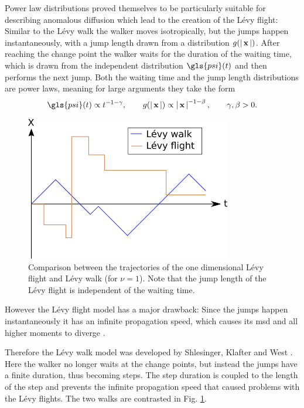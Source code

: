 Power law distributions proved themselves to be particularly suitable for describing anomalous diffusion which lead to the creation of the 
L\'evy flight: Similar to the L\'evy walk the walker moves isotropically, but the jumps happen instantaneously, with a jump length drawn from a distribution $g(\left|\,\mathbf{ x }\,\right|)$. After reaching the change point the walker waits for the duration of the waiting time, which is drawn from the independent distribution $\gls{psi}(t)$ and then performs the next jump. Both the waiting time and the jump length distributions are power laws, meaning for large arguments they take the form 
%
\begin{align}
\gls{psi}(t) \propto t^{-1-\gamma}, \qquad g(\abs{\ve{x}}) \propto \abs{\ve{x}}^{-1-\beta}, \qquad \gamma, \beta > 0.
\end{align} 
%
\begin{figure}
\begin{center}
\includegraphics[width=90mm]{pics/levyFlight.png}
\caption{Comparison between the trajectories of the one dimensional L\'evy flight and L\'evy walk (for $\nu=1$). Note that the jump length of the L\'evy flight is independent of the waiting time. 
\label{fig:levyFlight}}
\end{center}
\end{figure}
%
However the L\'evy flight model has a major drawback: Since the jumps happen instantaneously it has an infinite propagation speed, which causes its \gls{msd} and all higher moments to diverge \cite{lwreview}. 

Therefore the L\'evy walk model was developed by Shlesinger, Klafter and West \cite{shlesinger1987}. Here the walker no longer waits at the change points, but instead the jumps have a finite duration, thus becoming steps. The step duration is coupled to the length of the step and prevents the infinite propagation speed that caused problems with the L\'evy flights. The two walks are contrasted in Fig. \ref{fig:levyFlight}. 

